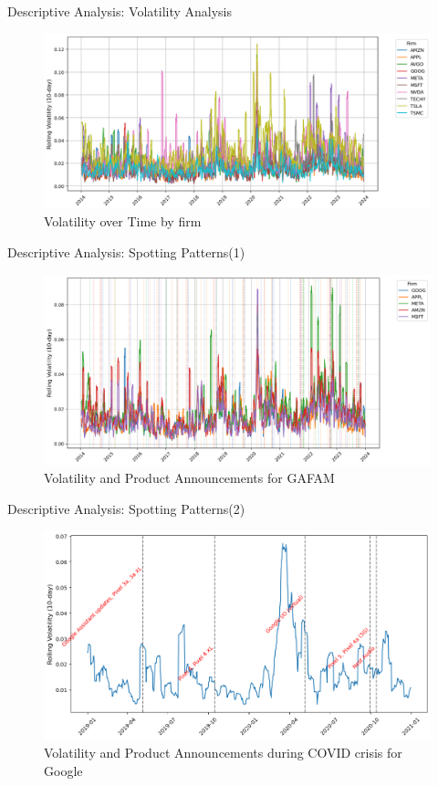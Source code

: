 \documentclass{beamer}
\begin{document}
\begin{frame}{Descriptive Analysis: Volatility Analysis}
  
\begin{figure}
    \centering
    \includegraphics[width=0.9\linewidth]{volatility_analysis.png}
    \caption{Volatility over Time by firm}
    \label{fig:volatility_analysis}
\end{figure}
    
\end{frame}

\begin{frame}{Descriptive Analysis: Spotting Patterns(1)}
  
\begin{figure}
    \centering
    \includegraphics[width=0.9\linewidth]{GAFAM_pattern.png}
    \caption{Volatility and Product Announcements for GAFAM}
    \label{fig:GAFAM_pattern}
\end{figure}
    
\end{frame}

\begin{frame}{Descriptive Analysis: Spotting Patterns(2)}
  
\begin{figure}
    \centering
    \includegraphics[width=0.8\linewidth]{GOOG_pattern.png}
    \caption{Volatility and Product Announcements during COVID crisis for Google}
    \label{fig:GOOG_pattern}
\end{figure}
    
\end{frame}
\end{document}
